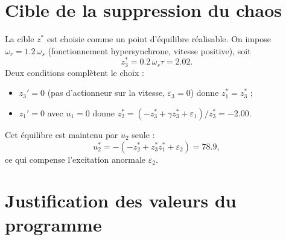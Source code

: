 \documentclass[11pt,a4paper]{article}
\begin{document}
\section{Cible de la suppression du chaos}
La cible $z^\ast$ est choisie comme un point d'équilibre réalisable. On impose $\omega_r=1.2\,\omega_s$ (fonctionnement hypersynchrone, vitesse positive), soit
\[
z_3^\ast=0.2\,\omega_s\tau=2.02 .
\]
Deux conditions complètent le choix :
\begin{itemize}
\item $z_3'=0$ (pas d'actionneur sur la vitesse, $\varepsilon_3=0$) donne $z_1^\ast=z_3^\ast$ ;
\item $z_1'=0$ avec $u_1=0$ donne $z_2^\ast=(-z_3^\ast+\gamma z_3^\ast+\varepsilon_1)/z_3^\ast=-2.00$.
\end{itemize}
Cet équilibre est maintenu par $u_2$ seule :
\[
u_2^\ast=-(-z_2^\ast+z_3^\ast z_1^\ast+\varepsilon_2)=78.9 ,
\]
ce qui compense l'excitation anormale $\varepsilon_2$.

\section{Justification des valeurs du programme}
\end{document}
